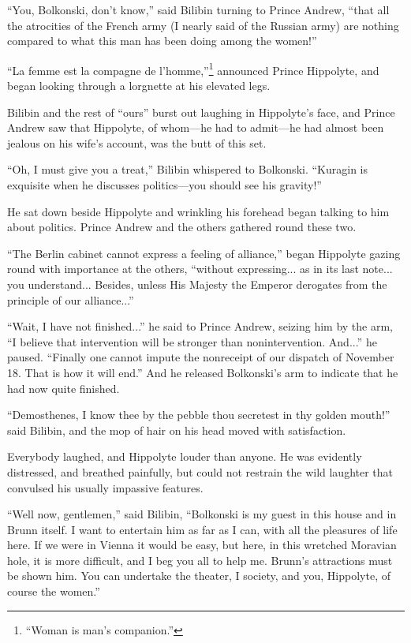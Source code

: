 ``You, Bolkonski, don't know,'' said Bilibin turning to Prince
Andrew, ``that all the atrocities of the French army (I nearly
said of the Russian army) are nothing compared to what this man
has been doing among the women!''

``La femme est la compagne de l'homme,''\footnote{``Woman is
man's companion.''} announced Prince Hippolyte, and began looking
through a lorgnette at his elevated legs.

Bilibin and the rest of ``ours'' burst out laughing in
Hippolyte's face, and Prince Andrew saw that Hippolyte, of
whom---he had to admit---he had almost been jealous on his wife's
account, was the butt of this set.

``Oh, I must give you a treat,'' Bilibin whispered to
Bolkonski. ``Kuragin is exquisite when he discusses
politics---you should see his gravity!''

He sat down beside Hippolyte and wrinkling his forehead began
talking to him about politics. Prince Andrew and the others
gathered round these two.

``The Berlin cabinet cannot express a feeling of alliance,''
began Hippolyte gazing round with importance at the others,
``without expressing... as in its last note... you
understand... Besides, unless His Majesty the Emperor derogates
from the principle of our alliance...''

``Wait, I have not finished...'' he said to Prince Andrew,
seizing him by the arm, ``I believe that intervention will be
stronger than nonintervention. And...'' he paused. ``Finally one
cannot impute the nonreceipt of our dispatch of November 18. That
is how it will end.'' And he released Bolkonski's arm to indicate
that he had now quite finished.

``Demosthenes, I know thee by the pebble thou secretest in thy
golden mouth!'' said Bilibin, and the mop of hair on his head
moved with satisfaction.

Everybody laughed, and Hippolyte louder than anyone. He was
evidently distressed, and breathed painfully, but could not
restrain the wild laughter that convulsed his usually impassive
features.

``Well now, gentlemen,'' said Bilibin, ``Bolkonski is my guest in
this house and in Brunn itself. I want to entertain him as far as
I can, with all the pleasures of life here. If we were in Vienna
it would be easy, but here, in this wretched Moravian hole, it is
more difficult, and I beg you all to help me. Brunn's attractions
must be shown him. You can undertake the theater, I society, and
you, Hippolyte, of course the women.''

